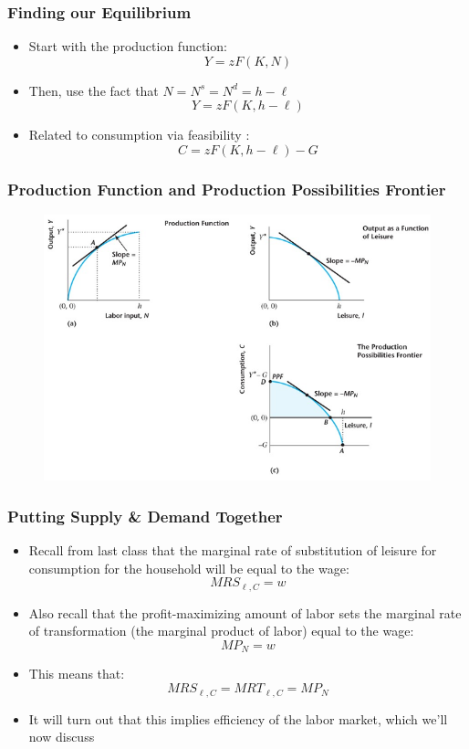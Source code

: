 \documentclass{beamer}
\begin{document}
\begin{frame}
\frametitle[alignment=center]{Finding our Equilibrium}
\begin{itemize}
\item Start with the production function:
$$Y=zF(K,N)$$
\item Then, use the fact that $N=N^s=N^d=h-\ell$
$$Y=zF(K,h-\ell)$$
\item Related to consumption via  feasibility :
$$C=zF(K,h-\ell)-G$$
\end{itemize}
\end{frame}

\begin{frame}
\frametitle[alignment=center]{Production Function and Production Possibilities Frontier}
\begin{figure}
\centering
\includegraphics[scale=0.5]{Figures/W_Fig_5pt2.png}
\end{figure}
\end{frame}

\begin{frame}
\frametitle[alignment=center]{Putting Supply \& Demand Together}
\begin{itemize}
\item Recall from last class that the marginal rate of substitution of leisure for consumption for the household will be equal to the wage:
$$MRS_{\ell,C}=w$$
\item Also recall that the profit-maximizing amount of labor sets the marginal rate of transformation (the marginal product of labor) equal to the wage:
$$MP_N=w$$
\item This means that:
$$MRS_{\ell,C} =MRT_{\ell,C}=MP_N$$
\item It will turn out that this implies efficiency of the labor market, which we'll now discuss 
\end{itemize}
\end{frame}
\end{document}
